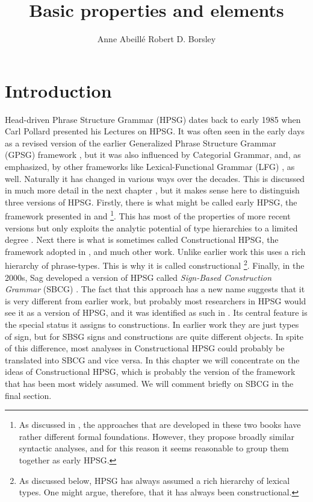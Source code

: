 \documentclass[output=paper
	        ,collection
	        ,collectionchapter
 	        ,biblatex
                ,babelshorthands
                ,newtxmath
                ,draftmode
                ,colorlinks, citecolor=brown
]{langscibook}
\title{Basic properties and elements}
\author{%
 Anne Abeillé\affiliation{Université Paris Diderot}%
 \lastand Robert D. Borsley\affiliation{University of Essex}%
}
\begin{document}
\maketitle
\label{chapter-basic-properties}\label{chap-properties}



\section{Introduction} 
Head-driven Phrase Structure Grammar (HPSG) dates back to early 1985 when Carl Pollard presented his Lectures on HPSG. It was often seen in the early days as a revised version of the earlier Generalized Phrase Structure Grammar (GPSG) framework \citep{GKPS85a}, but it was also influenced by Categorial Grammar, and, as \citet[1]{ps} emphasized, by other frameworks like Lexical-Functional Grammar (LFG) \citep{Bresnan82a-ed}, as well. Naturally it has changed in various ways over the decades. This is discussed in much more detail in the next chapter , but it makes sense here to distinguish three versions of HPSG. Firstly, there is what might be called early HPSG, the framework presented in \citet{ps} and \citet{ps2}%
%
\footnote{As discussed in , the approaches that are developed in these two books have rather different formal foundations. However, they propose broadly similar syntactic analyses, and for this reason it seems reasonable to group them together as early HPSG.}.
%
This has most of the properties of more recent versions but only exploits the analytic potential of type hierarchies to a limited degree \citep{Flickinger87,FPW85a}. Next there is what is sometimes called Constructional HPSG, the framework adopted in \citet{Sag97a,GSag2000a-u}, and much other work. Unlike earlier work this uses a rich hierarchy of phrase-types. This is why it is called constructional%
%
\footnote{As discussed below, HPSG has always assumed a rich hierarchy of lexical types. One might argue, therefore, that it has always been constructional.}.
%
Finally, in the 2000s, Sag developed a version of HPSG called \emph{Sign-Based Construction Grammar} (SBCG) \citep{Sag2012a}. The fact that this approach has a new name suggests that it is very different from earlier work, but probably most researchers in HPSG would see it as a version of HPSG, and it was identified as such in \citet[486]{Sag2010b}. Its central feature is the special status it assigns to constructions. In earlier work they are just types of sign, but for SBSG signs and constructions are quite different objects. In spite of this difference, most analyses in Constructional HPSG could probably be translated into SBCG and vice versa. In this chapter we will concentrate on the ideas of Constructional HPSG, which is probably the version of the framework that has been most widely assumed. We will comment briefly on SBCG in the final section.
\end{document}
